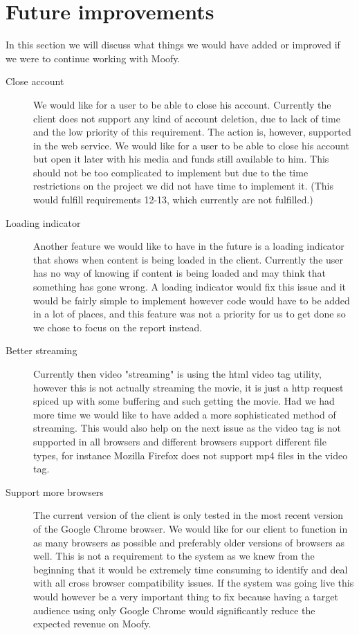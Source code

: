 \section{Future improvements}
\label{sec:futureimps}
In this section we will discuss what things we would have added or improved if we were to continue working with Moofy.

\begin{description}
\item[Close account] We would like for a user to be able to close his account.
Currently the client does not support any kind of account deletion, due to lack of
time and the low priority of this requirement. The action is, however, supported in the
web service. We would like for a user to be able to close his account but open
it later with his media and funds still available to him. This should not be
too complicated to implement but due to the time restrictions on the project we
did not have time to implement it. (This would fulfill requirements 12-13,
which currently are not fulfilled.)

\item[Loading indicator] Another feature we would like to have in the future is
a loading indicator that shows when content is being loaded in the client.
Currently the user has no way of knowing if content is being loaded and may
think that something has gone wrong. A loading indicator would fix this issue
and it would be fairly simple to implement however code would have to be added
in a lot of places, and this feature was not a priority for us to get done so
we chose to focus on the report instead.

\item[Better streaming] Currently then video "streaming" is using the html
video tag utility, however this is not actually streaming the movie, it is just
a http request spiced up with some buffering and such getting the movie. Had we
had more time we would like to have added a more sophisticated method of
streaming. This would also help on the next issue as the video tag is not
supported in all browsers and different browsers support different file types,
for instance Mozilla Firefox does not support mp4 files in the video tag.

\item[Support more browsers] The current version of the client is only tested
in the most recent version of the Google Chrome browser. We would like for our
client to function in as many browsers as possible and preferably older
versions of browsers as well. This is not a requirement to the system as we
knew from the beginning that it would be extremely time consuming to identify
and deal with all cross browser compatibility issues. If the system was going
live this would however be a very important thing to fix because having a
target audience using only Google Chrome would significantly reduce the
expected revenue on Moofy.


\end{description}
